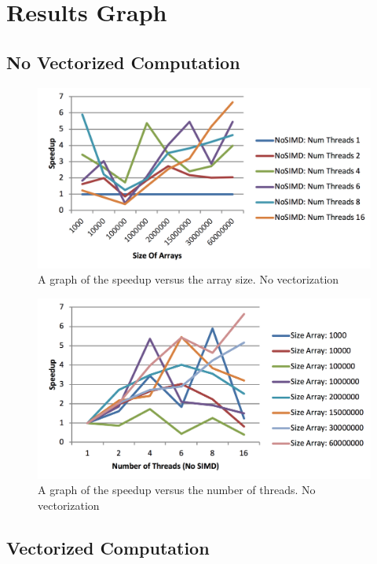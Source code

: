\documentclass[onecolumn,draftclsnofoot, 10pt, compsoc]{IEEEtran}
\begin{document}
	
	\section{Results Graph}
	
		
		
		\subsection{No Vectorized Computation}
			\begin{figure}[H]
				\includegraphics[width=16cm]{noSimSpeedVsNums}
				\centering
				\caption{A graph of the speedup versus the array size. No vectorization}
			\end{figure}
		
		\begin{figure}[H]
			\includegraphics[width=16cm]{noSimSpeedVsThreads}
			\centering
			\caption{A graph of the speedup versus the number of threads. No vectorization}
		\end{figure}
				
				
		\subsection{Vectorized Computation}
			
\end{document}

